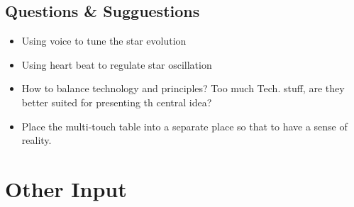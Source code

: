 \subsection{Questions & Sugguestions}
\begin{itemize}
\item Using voice to tune the star evolution
\item Using heart beat to regulate star oscillation
\item How to balance technology and principles? Too much Tech. stuff, are they better suited for presenting th central idea?
\item Place the multi-touch table into a separate place so that to have a sense of reality. 
\end{itemize}

\section{Other Input}

